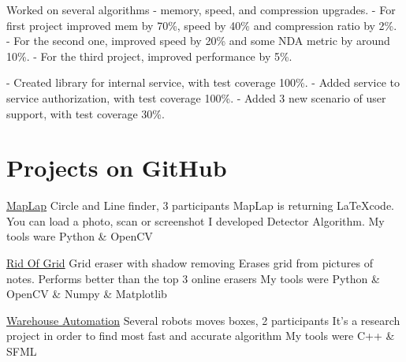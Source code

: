 \documentclass[12pt,a4paper]{moderncv}
\begin{document}
            {Worked on several algorithms - memory, speed, and compression upgrades. \newline
             - For first project improved mem by 70\%, speed by 40\% and compression ratio by 2\%. \newline
             - For the second one, improved speed by 20\% and some NDA metric by around 10\%. \newline
             - For the third project, improved performance by 5\%.}
    
            {- Created library for internal service, with test coverage 100\%. \newline
             - Added service to service authorization, with test coverage 100\%. \newline
             - Added 3 new scenario of user support, with test coverage 30\%. \newline}
        
    \section{Projects on GitHub}
        
            {\href {https://github.com/a-alex-l/MapLap} {MapLap}} {Circle and Line finder, 3 participants}
            {\newline MapLap is returning \LaTeX code. You can load a photo, scan or screenshot} {}
            {I developed Detector Algorithm. My tools ware \textcolor{Attention} {Python \& OpenCV}}
        
            {\href{https://github.com/a-alex-l/Rid_of_Grid} {Rid Of Grid}} {Grid eraser with shadow removing}
            {\newline Erases grid from pictures of notes. Performs better than the top 3 online erasers}{}
            {My tools were \textcolor{Attention} {Python \& OpenCV \& Numpy \& Matplotlib}}
        
            {\href{https://github.com/a-alex-l/Warehouse_Automation} {Warehouse Automation}} {Several robots moves boxes, 2 participants}
            {\newline It's a research project in order to find most fast and accurate algorithm}{}
            {My tools were \textcolor{Attention} {C++ \& SFML}}
        
\end{document}
